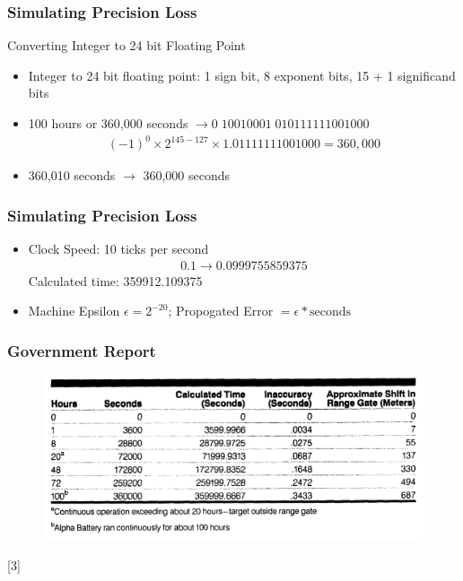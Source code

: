 \documentclass[10pt]{beamer}
\begin{document}
\begin{frame}
    \frametitle{Simulating Precision Loss}
    Converting Integer to 24 bit Floating Point
    \begin{itemize}
        \item Integer to 24 bit floating point: 1 sign bit, 8 exponent bits, 15 + 1 significand bits
        \item 100 hours or 360,000 seconds $\to 0\;10010001\; 010111111001000$
        \begin{align*}
            (-1)^0 \times 2^{145 - 127} \times 1.01111111001000 = 360,000
        \end{align*}
        \item 360,010 seconds $\to$ 360,000 seconds
    \end{itemize}
\end{frame}

\begin{frame}
    \frametitle{Simulating Precision Loss}
    \begin{itemize}
        \item Clock Speed: 10 ticks per second
        \begin{align*}
            0.1 \to 0.0999755859375
        \end{align*}
        Calculated time: 359912.109375
        \item Machine Epsilon $\epsilon = 2^{-20}$;
        Propogated Error $= \epsilon * \text{seconds}$
    \end{itemize}

\end{frame}
\begin{frame}
    \frametitle{Government Report}
    \begin{figure}
        \centering
        \includegraphics[width=1.0\textwidth]{patriot.png}
    \end{figure}
    [3]
\end{frame}
\end{document}
